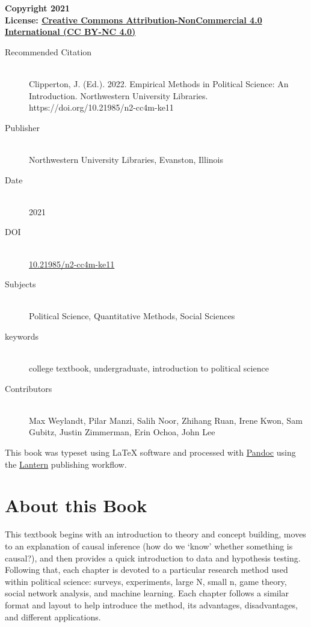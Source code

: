 \documentclass{book}
\newcommand{\booklicense}{\href{https://creativecommons.org/licenses/by-nc/4.0/}{Creative
Commons Attribution-NonCommercial 4.0 International (CC BY-NC 4.0)}}
\begin{document}
\begin{flushleft}

\textbf{Copyright \textcopyright{} 2021  \\
License: \booklicense}\\[11pt] 


\vspace*{\fill}

\begin{description}
  \item[Recommended Citation] \hfill \\ Clipperton, J. (Ed.). 2022. Empirical
Methods in Political Science: An Introduction. Northwestern University
Libraries. https://doi.org/10.21985/n2-cc4m-ke11
  \item[Publisher] \hfill \\ Northwestern University Libraries, Evanston,
Illinois
  \item[Date] \hfill \\ 2021
          \item[DOI] \hfill \\ \href{https://doi.org/10.21985/n2-cc4m-ke11}{10.21985/n2-cc4m-ke11}
    \item[Subjects] \hfill \\ Political Science, Quantitative Methods, Social
Sciences
  \item[keywords] \hfill \\ college textbook, undergraduate, introduction to
political science
    \item[Contributors] \hfill \\ Max Weylandt, Pilar Manzi, Salih
Noor, Zhihang Ruan, Irene Kwon, Sam Gubitz, Justin Zimmerman, Erin Ochoa, John
Lee
  
\end{description}


\vspace*{\fill}

This book was typeset using \LaTeX{} software and processed with \href{https://pandoc.org}{Pandoc} using the \href{http://lantern.northwestern.pub}{Lantern} publishing workflow.\\

\end{flushleft}

\addtocounter{page}{2}

\chapter*{About this Book}
This textbook begins with an introduction to theory and concept building,
moves to an explanation of causal inference (how do we `know' whether
something is causal?), and then provides a quick introduction to data and
hypothesis testing. Following that, each chapter is devoted to a particular
research method used within political science: surveys, experiments, large N,
small n, game theory, social network analysis, and machine learning. Each
chapter follows a similar format and layout to help introduce the method, its
advantages, disadvantages, and different applications.
\end{document}
